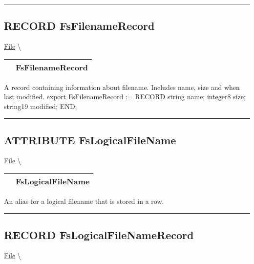 \rule{\linewidth}{0.5pt}

\subsection*{\textsf{\colorbox{headtoc}{\color{white} RECORD}
FsFilenameRecord}}

\hypertarget{ecldoc:file.fsfilenamerecord}{}
\hspace{0pt} \hyperlink{ecldoc:File}{File} \textbackslash 

{\renewcommand{\arraystretch}{1.5}
\begin{tabularx}{\textwidth}{|>{\raggedright\arraybackslash}l|X|}
\hline
\hspace{0pt}\mytexttt{\color{red} } & \textbf{FsFilenameRecord} \\
\hline
\end{tabularx}
}

\par
A record containing information about filename. Includes name, size and when last modified. export FsFilenameRecord := RECORD string name; integer8 size; string19 modified; END;


\rule{\linewidth}{0.5pt}
\subsection*{\textsf{\colorbox{headtoc}{\color{white} ATTRIBUTE}
FsLogicalFileName}}

\hypertarget{ecldoc:file.fslogicalfilename}{}
\hspace{0pt} \hyperlink{ecldoc:File}{File} \textbackslash 

{\renewcommand{\arraystretch}{1.5}
\begin{tabularx}{\textwidth}{|>{\raggedright\arraybackslash}l|X|}
\hline
\hspace{0pt}\mytexttt{\color{red} } & \textbf{FsLogicalFileName} \\
\hline
\end{tabularx}
}

\par
An alias for a logical filename that is stored in a row.


\rule{\linewidth}{0.5pt}
\subsection*{\textsf{\colorbox{headtoc}{\color{white} RECORD}
FsLogicalFileNameRecord}}

\hypertarget{ecldoc:file.fslogicalfilenamerecord}{}
\hspace{0pt} \hyperlink{ecldoc:File}{File} \textbackslash 

